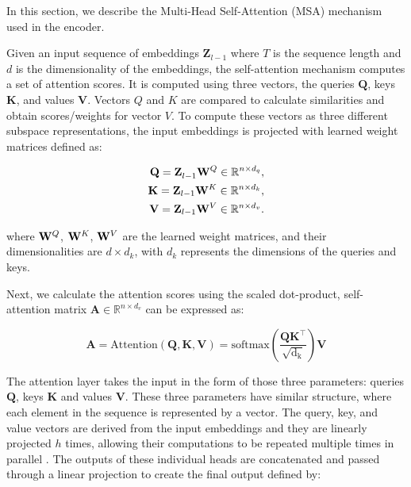 In this section, we describe the Multi-Head Self-Attention (MSA) mechanism used in the encoder. 

Given an input sequence of embeddings $\mathbf{Z}_{l-1}$ where $T$ is the sequence length and $d$ is the dimensionality of the embeddings, the self-attention mechanism computes a set of attention scores. It is computed using three vectors, the queries $\mathbf{Q}$, keys $\mathbf{K}$, and values $\mathbf{V}$. Vectors $Q$ and $K$ are compared to calculate similarities and obtain scores/weights for vector $V$. To compute these vectors as three different subspace representations, the input embeddings is projected with learned weight matrices defined as:

\begin{equation}
\begin{split}
\mathbf{Q=Z}_{l-1}\mathbf{W^{\mathnormal{Q}} \in \mathbb{R}^{\mathnormal{n \times d_q}}},\\
\mathbf{K=Z}_{l-1}\mathbf{W^{\mathnormal{K}} \in \mathbb{R}^{\mathnormal{n \times d_k}}},\\
\mathbf{V=Z}_{l-1}\mathbf{W^{\mathnormal{V}} \in \mathbb{R}^{\mathnormal{n \times d_v}}}.
\label{eq:attention_qkv}
\end{split}
\end{equation}

where $\mathbf{W}^{\mathnormal{Q}}$, $\mathbf{W}^{\mathnormal{K}}$, $\mathbf{W}^{\mathnormal{V}}$ are the learned weight matrices, and their dimensionalities are $d \times d_k$, with $d_k$ represents the dimensions of the queries and keys. 

Next, we calculate the attention scores using the scaled dot-product, self-attention matrix $\mathbf{A} \in \mathbb{R}^{n \times d_v}$ can be expressed as:

\begin{equation}
\mathbf{A}=\mathrm{Attention\mathbf{(Q,K,V)} = softmax \left ( \frac{\mathbf{QK}^\top}{\sqrt{d_k}} \right ) \mathbf{V}}
\label{eq:scaled-dot-product}
\end{equation}

The attention layer takes the input in the form of those three parameters: queries $\mathbf{Q}$, keys $\mathbf{K}$ and values $\mathbf{V}$. These three parameters have similar structure, where each element in the sequence is represented by a vector. The query, key, and value vectors are derived from the input embeddings and they are linearly projected $h$ times, allowing their computations to be repeated multiple times in parallel \citep{vaswani2017attention}. The outputs of these individual heads are concatenated and passed through a linear projection to create the final output defined by:

